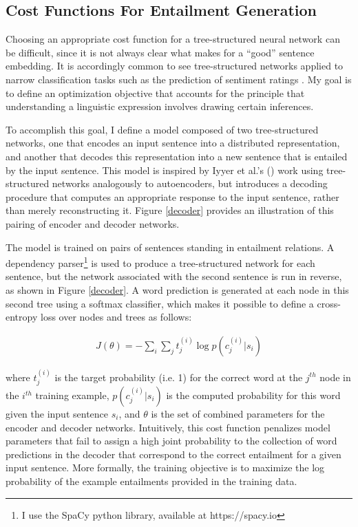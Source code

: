 \subsection{Cost Functions For Entailment Generation}

Choosing an appropriate cost function for a tree-structured neural network can be difficult, since it is not always clear what makes for a ``good'' sentence embedding. It is accordingly common to see tree-structured networks applied to narrow classification tasks such as the prediction of sentiment ratings \citep[e.g.,][]{Socher:2012}. My goal is to define an optimization objective that accounts for the principle that understanding a linguistic expression involves drawing certain inferences.

To accomplish this goal, I define a model composed of two tree-structured networks, one that encodes an input sentence into a distributed representation, and another that decodes this representation into a new sentence that is entailed by the input sentence. This model is inspired by Iyyer et al.'s (\citeyear{Iyyer:2014}) work using tree-structured networks analogously to autoencoders, but introduces a decoding procedure that computes an appropriate response to the input sentence, rather than merely reconstructing it. Figure \ref{decoder} provides an illustration of this pairing of encoder and decoder networks.

The model is trained on pairs of sentences standing in entailment relations. A dependency parser\footnote{I use the SpaCy python library, available at https://spacy.io} is used to produce a tree-structured network for each sentence, but the network associated with the second sentence is run in reverse, as shown in Figure \ref{decoder}. A word prediction is generated at each node in this second tree using a softmax classifier, which makes it possible to define a cross-entropy loss over nodes and trees as follows: 

\begin{align}
J(\theta) = - \sum_{i} \sum_{j} t^{(i)}_j \log{ p(c^{(i)}_j | s_i)}
\end{align}

\noindent
where $t^{(i)}_j$ is the target probability (i.e. 1) for the correct word at the $j^{th}$ node in the $i^{th}$ training example, $p(c^{(i)}_j | s_i)$ is the computed probability for this word given the input sentence $s_i$, and $\theta$ is the set of combined parameters for the encoder and decoder networks. Intuitively, this cost function penalizes model parameters that fail to assign a high joint probability to the collection of word predictions in the decoder that correspond to the correct entailment for a given input sentence. More formally, the training objective is to maximize the log probability of the example entailments provided in the training data. 

